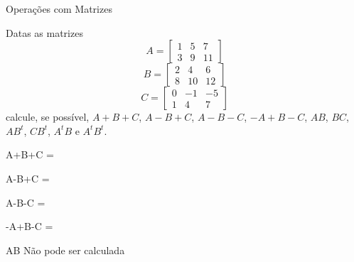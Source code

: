 \begin{exercicios}{Operações com Matrizes}
    \begin{exercicio}
        Datas as matrizes
        \[ A = \left[\begin{array}{rrr}
            1 & 5 & 7 \\
            3 & 9 & 11
        \end{array} \right]
        \]\[
        B = \left[\begin{array}{rrr}
            2 &  4 &  6 \\
            8 & 10 & 12
        \end{array} \right]
        \]\[
        C = \left[\begin{array}{rrr}
            0 & -1 & -5 \\
            1 &  4 &  7
        \end{array} \right] \]
        calcule, se possível, $A+B+C$, $A-B+C$, $A-B-C$, $-A+B-C$, $AB$, $BC$, $AB^t$, $CB^t$, $A^tB$ e $A^tB^t$.
        \begin{answers}
            \begin{mathlist}[2]
            \item A+B+C    =   
            \item A-B+C    =   
            \item A-B-C    =   
            \item -A+B-C   =   
            \item AB \) Não pode ser calculada

\end{mathlist}
\end{answers}
\end{exercicio}
\end{exercicios}
